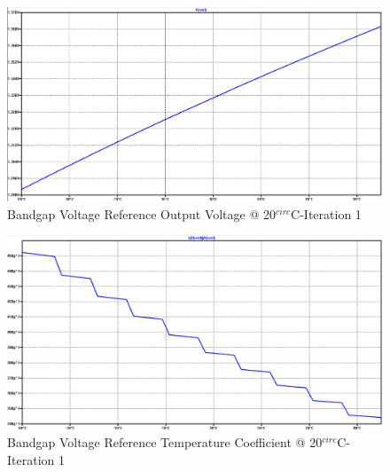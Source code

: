 \begin{figure}[!htbp]
  	\centering
  	\includegraphics[scale=0.15]{images/appendix/bg1-vref.png}
  	\caption[output-z-meas]{Bandgap Voltage Reference Output Voltage @ 20$^{circ}$C-Iteration 1}
  	\label{fig:bg1-vref}
	\end{figure}
\begin{figure}[!htbp]
  	\centering
  	\includegraphics[scale=0.15]{images/appendix/bg1-tempco.png}
  	\caption[output-z-meas]{Bandgap Voltage Reference Temperature Coefficient @ 20$^{circ}$C-Iteration 1}
  	\label{fig:bg1-tempco}
	\end{figure}

